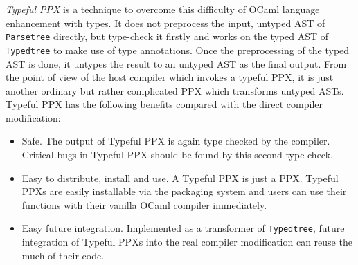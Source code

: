 \documentclass{article}
\begin{document}
\emph{Typeful PPX} is a technique to overcome this difficulty of OCaml
language enhancement with types. It does not preprocess the input,
untyped AST of \texttt{Parsetree} directly, but type-check it firstly
and works on the typed AST of \texttt{Typedtree} to make use of type
annotations. Once the preprocessing of the typed AST is done, it untypes
the result to an untyped AST as the final output. From the point of view
of the host compiler which invokes a typeful PPX, it is just another
ordinary but rather complicated PPX which transforms untyped ASTs.
%
%
Typeful PPX has the following benefits compared with the direct compiler
modification:

\begin{itemize}
\item Safe. The output of Typeful PPX is again type checked by the compiler.
Critical bugs in Typeful PPX should be found by this second type check.

\item Easy to distribute, install and use. A Typeful PPX is just a PPX.
Typeful PPXs are easily installable via the packaging system and users
can use their functions with their vanilla OCaml compiler immediately.

\item Easy future integration. Implemented as a transformer of
\texttt{Typedtree}, future integration of Typeful PPXs into the real
compiler modification can reuse the much of their code.
\end{itemize}

% 
% 
\end{document}
